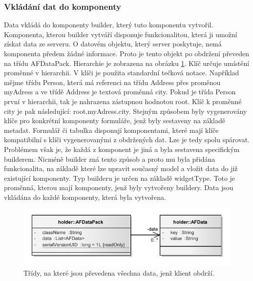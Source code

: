 \subsubsection{Vkládání dat do komponenty}
Data vkládá do komponenty builder, který tuto komponentu vytvořil. Komponenta, kterou builder vytváří disponuje funkcionalitou, která ji umožní získat data ze serveru. O datovém objektu, který server poskytuje, nemá komponenta předem žádné informace. Proto je tento objekt po obdržení převeden na třídu AFDataPack. Hierarchie je zobrazena na obrázku \ref{img:dataPack}. 
Klíč určuje umístění proměnné v hierarchii. V klíči je použita standardní tečková notace. Například mějme třídu Person, která má referenci na třídu Address přes proměnou myAdress a ve třídě Address je textová proměnná city. Pokud je třída Person první v hierarchii, tak je nahrazena zástupnou hodnotou root. Klíč k proměnné city je pak následující: root.myAdress.city. Stejným způsobem byly vygenerovány klíče pro konkrétní komponenty formuláře, jenž byly sestaveny na základě metadat. Formulář či tabulka disponují komponentami, které mají klíče kompatibilní s klíči vygenerovanými z obdržených dat. Lze je tedy spolu spárovat. Problémem však je, že každá z komponent je jiná a byla sestavena specifickým builderem. Nicméně builder zná tento způsob a proto mu byla přidána funkcionalita, na základě které lze upravit současný model a vložit data do již existující komponenty. Typ builderu je určen na základě widgetType. Toto je proměnná, kterou mají komponenty, jenž byly vytvořeny buildery. Data jsou vkládána do každé komponenty, která byla vytvořena.

\begin{figure}[h!]
\begin{center}
\includegraphics{images/dataPack}
\caption{Třídy, na které jsou převedena všechna data, jenž klient obdrží.}
\label{img:dataPack}
\end{center}
\end{figure}

